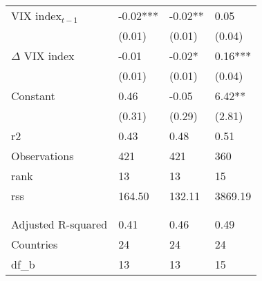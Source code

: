 {\begin{tabular}{lp{2cm}p{2cm}p{2cm}}
  VIX index$_{t-1}$ & -0.02*** & -0.02** & 0.05 \\ 
   & (0.01) & (0.01) & (0.04) \\ 
  $\Delta$ VIX index & -0.01 & -0.02* & 0.16*** \\ 
   & (0.01) & (0.01) & (0.04) \\ 
  Constant & 0.46 & -0.05 & 6.42** \\ 
   & (0.31) & (0.29) & (2.81) \\ 
  r2 & 0.43 & 0.48 & 0.51 \\ 
  Observations & 421 & 421 & 360 \\ 
  rank & 13 & 13 & 15 \\ 
  rss & 164.50 & 132.11 & 3869.19 \\ 
   &  &  &  \\ 
   &  &  &  \\ 
  Adjusted R-squared & 0.41 & 0.46 & 0.49 \\ 
  Countries & 24 & 24 & 24 \\ 
  df_b & 13 & 13 & 15 \\ 
   \hline
\end{tabular}
}
